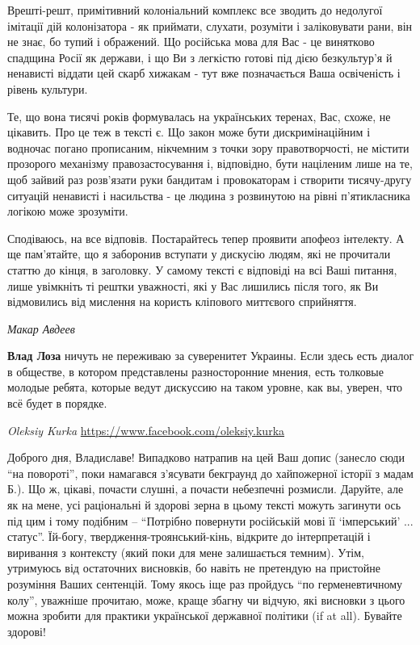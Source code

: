 \begin{itemize}
Врешті-решт, примітивний колоніальний комплекс все зводить до недолугої
імітації дій колонізатора - як приймати, слухати, розуміти і заліковувати рани,
він не знає, бо тупий і ображений. Що російська мова для Вас - це винятково
спадщина Росії як держави, і що Ви з легкістю готові під дією безкультур'я й
ненависті віддати цей скарб хижакам - тут вже позначається Ваша освіченість і
рівень культури. 

Те, що вона тисячі років формувалась на українських теренах, Вас, схоже, не
цікавить. Про це теж в тексті є. Що закон може бути дискримінаційним і водночас
погано прописаним, нікчемним з точки зору правотворчості, не містити прозорого
механізму правозастосування і, відповідно, бути націленим лише на те, щоб
зайвий раз розв'язати руки бандитам і провокаторам і створити тисячу-другу
ситуацій ненависті і насильства - це людина з розвинутою на рівні п'ятикласника
логікою може зрозуміти. 

Сподіваюсь, на все відповів. Постарайтесь тепер проявити апофеоз інтелекту. А
ще пам'ятайте, що я заборонив вступати у дискусію людям, які не прочитали
статтю до кінця, в заголовку. У самому тексті є відповіді на всі Ваші питання,
лише увімкніть ті рештки уважності, які у Вас лишились після того, як Ви
відмовились від мислення на користь кліпового миттєвого сприйняття.

\emph{Макар Авдеев}

\textbf{Влад Лоза} ничуть не переживаю за суверенитет Украины. Если здесь есть
диалог в обществе, в котором представлены разносторонние мнения, есть толковые
молодые ребята, которые ведут дискуссию на таком уровне, как вы, уверен, что
всё будет в порядке.

\emph{Oleksiy Kurka}
\url{https://www.facebook.com/oleksiy.kurka}

Доброго дня, Владиславе! Випадково натрапив на цей Ваш допис (занесло сюди
\enquote{на повороті}, поки намагався з'ясувати бекграунд до хайпожерної
історії з мадам Б.). Що ж, цікаві, почасти слушні, а почасти небезпечні
розмисли. Даруйте, але як на мене, усі раціональні й здорові зерна в цьому
тексті можуть загинути ось під цим і тому подібним -- \enquote{Потрібно
повернути російській мові її \enquote{імперський} ... статус}. Їй-богу,
твердження-троянський-кінь, відкрите до інтерпретацій і виривання з контексту
(який поки для мене залишається темним). Утім, утримуюсь від остаточних
висновків, бо навіть не претендую на пристойне розуміння Ваших сентенцій. Тому
якось іще раз пройдусь \enquote{по герменевтичному колу}, уважніше прочитаю,
може, краще збагну чи відчую, які висновки з цього можна зробити для практики
української державної політики (if at all). Бувайте здорові!

\end{itemize}
